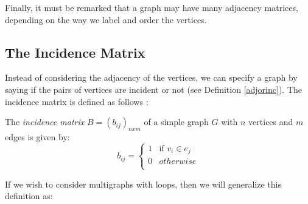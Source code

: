 		

Finally, it must be remarked that a graph may have many adjacency matrices, depending on the way we label and order the vertices.

\subsection{The Incidence Matrix}
Instead of considering the adjacency of the vertices, we can specify a graph by saying if the pairs of vertices are incident or not (see Definition \ref{adjorinc}). The incidence matrix is defined as follows \cite{diestel}: 

\begin{defn}
	The \textit{incidence matrix} $ B= (b_{ij})_{nxm}$ of a simple graph $G$ with $n$ vertices and $m$ edges is given by:
\begin{equation}
		b_{ij} = \begin{cases}
		1 & \text{if $v_{i} \in e_{j}$} \\
		0 & otherwise \\
		\end{cases}
\end{equation}
\end{defn}

If we wish to consider multigraphs with loops, then we will generalize this definition as:

